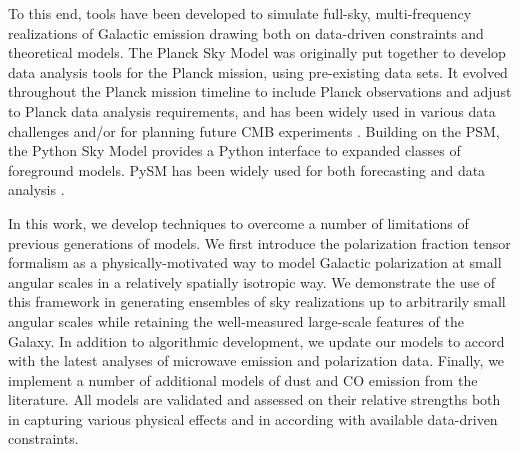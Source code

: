 \documentclass[twocolumn]{aastex631}
\newcommand{\giuse}[1]{\textcolor{orange}{(GP: #1)}}
\begin{document}
To this end, tools have been developed to simulate full-sky, multi-frequency realizations of Galactic emission drawing both on data-driven constraints and theoretical models. The Planck Sky Model \citep[PSM;][]{delabrouille2012} was originally put together to develop data analysis tools for the Planck mission, using pre-existing data sets. It evolved throughout the Planck mission timeline to include Planck observations and adjust to Planck data analysis requirements, and has been widely used in various data challenges and/or for planning future CMB experiments \citep[e.g.,][]{2022JCAP...10..063G,2022A&A...664A..18F}. Building on the PSM, the Python Sky Model \citep[PySM;][]{Thorne:2017} provides a Python interface to expanded classes of foreground models. PySM has been widely used for both forecasting \citep[e.g.,][]{Abazajian:2022,Hensley:2022,CCAT-PrimeCollaboration:2023,Wolz:2023} and data analysis \citep{Vacher:2023}.

In this work, we develop techniques to overcome a number of limitations of previous generations of models. We first introduce the polarization fraction tensor formalism as a physically-motivated way to model Galactic polarization at small angular scales in a relatively spatially isotropic way. We demonstrate the use of this framework in generating ensembles of sky realizations up to arbitrarily small angular scales while retaining the well-measured large-scale features of the Galaxy. In addition to algorithmic development, we update our models to accord with the latest analyses of microwave emission and polarization data. Finally, we implement a number of additional models of dust and CO emission from the literature. All models are validated and assessed on their relative strengths both in capturing various physical effects and in according with available data-driven constraints.


\end{document}
